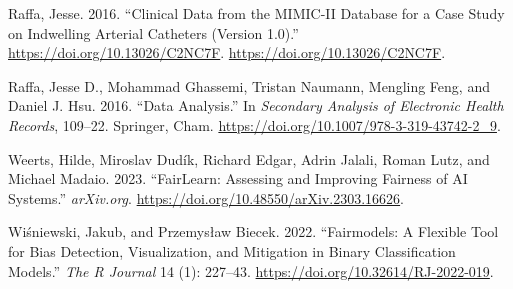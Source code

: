 \documentclass[10pt,a4paper,onecolumn]{article}
\newlength{\cslhangindent}
\newenvironment{CSLReferences}[2] %
 {\begin{list}{}{%
  \setlength{\itemindent}{0pt}
  \setlength{\leftmargin}{0pt}
  \setlength{\parsep}{0pt}
  \ifodd #1
   \setlength{\leftmargin}{\cslhangindent}
   \setlength{\itemindent}{-1\cslhangindent}
  \fi
  \setlength{\itemsep}{#2\baselineskip}}}
 {\end{list}}
\begin{document}
\begin{CSLReferences}{1}{0}
Raffa, Jesse. 2016. {``Clinical Data from the MIMIC-II Database for a
Case Study on Indwelling Arterial Catheters (Version 1.0).''}
\url{https://doi.org/10.13026/C2NC7F}.
\url{https://doi.org/10.13026/C2NC7F}.

Raffa, Jesse D., Mohammad Ghassemi, Tristan Naumann, Mengling Feng, and
Daniel J. Hsu. 2016. {``Data Analysis.''} In \emph{Secondary Analysis of
Electronic Health Records}, 109--22. Springer, Cham.
\url{https://doi.org/10.1007/978-3-319-43742-2_9}.

Weerts, Hilde, Miroslav Dudík, Richard Edgar, Adrin Jalali, Roman Lutz,
and Michael Madaio. 2023. {``FairLearn: Assessing and Improving Fairness
of AI Systems.''} \emph{arXiv.org}.
\url{https://doi.org/10.48550/arXiv.2303.16626}.

Wiśniewski, Jakub, and Przemysław Biecek. 2022. {``Fairmodels: A
Flexible Tool for Bias Detection, Visualization, and Mitigation in
Binary Classification Models.''} \emph{The R Journal} 14 (1): 227--43.
\url{https://doi.org/10.32614/RJ-2022-019}.

\end{CSLReferences}
\end{document}
